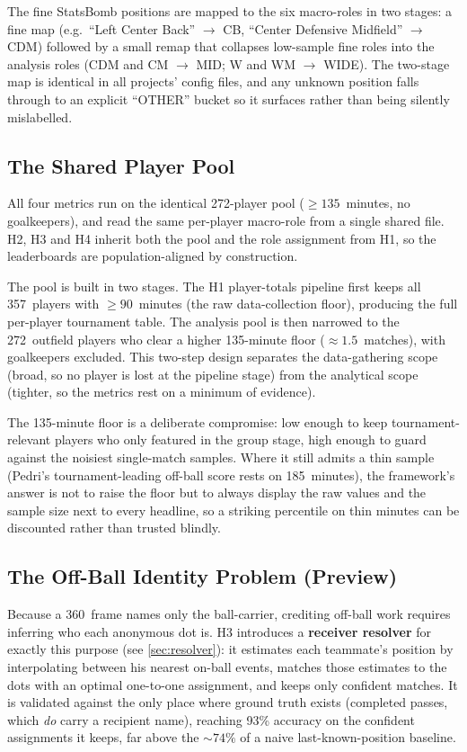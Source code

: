 \documentclass[12pt,a4paper]{article}
\begin{document}
The fine StatsBomb positions are mapped to the six macro-roles in two stages: a fine map (e.g.\ ``Left Center Back'' $\to$ CB, ``Center Defensive Midfield'' $\to$ CDM) followed by a small remap that collapses low-sample fine roles into the analysis roles (CDM and CM $\to$ MID; W and WM $\to$ WIDE).
The two-stage map is identical in all projects' config files, and any unknown position falls through to an explicit ``OTHER'' bucket so it surfaces rather than being silently mislabelled.

\subsection{The Shared Player Pool}\label{sec:pool}

All four metrics run on the identical 272-player pool ($\geq 135$~minutes, no goalkeepers), and read the same per-player macro-role from a single shared file.
H2, H3 and H4 inherit both the pool and the role assignment from H1, so the leaderboards are population-aligned by construction.

The pool is built in two stages.
The H1 player-totals pipeline first keeps all 357~players with $\geq 90$~minutes (the raw data-collection floor), producing the full per-player tournament table.
The analysis pool is then narrowed to the 272~outfield players who clear a higher 135-minute floor ($\approx 1.5$~matches), with goalkeepers excluded.
This two-step design separates the data-gathering scope (broad, so no player is lost at the pipeline stage) from the analytical scope (tighter, so the metrics rest on a minimum of evidence).

The 135-minute floor is a deliberate compromise: low enough to keep tournament-relevant players who only featured in the group stage, high enough to guard against the noisiest single-match samples.
Where it still admits a thin sample (Pedri's tournament-leading off-ball score rests on 185~minutes), the framework's answer is not to raise the floor but to always display the raw values and the sample size next to every headline, so a striking percentile on thin minutes can be discounted rather than trusted blindly.

\subsection{The Off-Ball Identity Problem (Preview)}\label{sec:identity-preview}

Because a 360~frame names only the ball-carrier, crediting off-ball work requires inferring who each anonymous dot is.
H3 introduces a \textbf{receiver resolver} for exactly this purpose (see \cref{sec:resolver}): it estimates each teammate's position by interpolating between his nearest on-ball events, matches those estimates to the dots with an optimal one-to-one assignment, and keeps only confident matches.
It is validated against the only place where ground truth exists (completed passes, which \emph{do} carry a recipient name), reaching 93\% accuracy on the confident assignments it keeps, far above the ${\sim}74\%$ of a naive last-known-position baseline.
\end{document}
